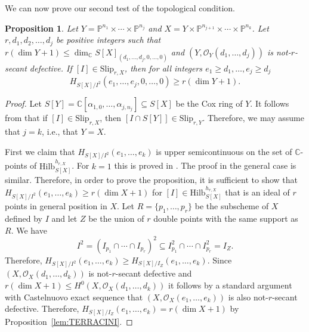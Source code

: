 \documentclass[12pt]{amsart}
\newtheorem{proposition}[theorem]{Proposition}
\theoremstyle{definition}
\theoremstyle{remark}
\theoremstyle{definition}
\newcommand{\HF}[2]{H_{#1}(#2)}
\newcommand{\Slip}[2]{\mathrm{Slip}_{#1,#2}}
\newcommand{\CC}{\mathbb{C}}
\newcommand{\OO}{\mathcal{O}}
\newcommand{\Hilb}{\mathrm{Hilb}}
\begin{document}
We can now prove our second test of the topological condition.


\begin{proposition}\label{prop:st_general}
Let $Y=\mathbb{P}^{n_1}\times \cdots \times \mathbb{P}^{n_j}$ and $X = Y \times \mathbb{P}^{n_{j+1}}\times \cdots \times \mathbb{P}^{n_k}$. Let $r, d_1, d_2,\ldots, d_j$ be positive integers such that 
$r(\dim Y+1) \leq \dim_\CC S[X]_{(d_1,\ldots, d_j, 0, \ldots, 0)}$ and $(Y,\OO_Y(d_1,\ldots, d_j))$ is not-$r$-secant defective. If $[I]\in \Slip{r}{X}$, then for all integers $e_1\geq d_1, \ldots, e_j\geq d_j$
\begin{equation}\label{ineq:st}
\HF{S[X]/I^2}{e_1,\ldots, e_j,0,\ldots, 0} \geq r(\dim Y+1).    
\end{equation}

\end{proposition} 
\begin{proof}
Let $S[Y]=\CC[\alpha_{1,0},\ldots, \alpha_{j,n_j}] \subseteq S[X]$ be the Cox ring of $Y$. It follows from \cite[Theorem~1.2]{Man23} that if $[I]\in \Slip{r}{X}$, then $[I\cap S[Y]]\in \Slip{r}{Y}$. Therefore, we may assume that $j=k$, i.e., that $Y=X$.

First we claim that $\HF{S[X]/I^2}{e_1,\ldots, e_k}$ is upper semicontinuous on the set of $\CC$-points of $\Hilb_{S[X]}^{h_{r,X}}$. For $k=1$ this is proved in \cite[Proof of Theorem~1.1]{Man22}.
The proof in the general case is similar. Therefore, in order to prove the proposition, it is sufficient to show that $\HF{S[X]/I^2}{e_1,\ldots, e_k} \geq r(\dim X+1)$ for $[I]\in \Hilb_{S[X]}^{h_{r,X}}$ that is an ideal of $r$ points in general position in $X$. Let $R = \{p_1,\ldots,p_r\}$ be the subscheme of $X$ defined by $I$ and let $Z$ be the union of $r$ double points with the same support as $R$.
We have 
\begin{equation}\label{eq:squarevssquare}
    I^2 = (I_{p_1}\cap \cdots \cap I_{p_r})^2\subseteq I_{p_1}^2\cap \cdots \cap I_{p_r}^2 = I_Z.
\end{equation}
Therefore, $\HF{S[X]/I^2}{e_1,\ldots, e_k}  \ge \HF{S[X]/I_Z}{e_1,\ldots, e_k}$. Since $(X,\OO_X(d_1,\ldots, d_k))$ is not-$r$-secant defective and $r(\dim X+1) \le H^0(X, \OO_X(d_1,\ldots,d_k))$
it follows by a standard argument with Castelnuovo exact sequence that $(X,\OO_X(e_1,\ldots, e_k))$ is also not-$r$-secant defective. Therefore, $\HF{S[X]/I_Z}{e_1,\ldots, e_k} = r(\dim X+1)$ by Proposition~\ref{lem:TERRACINI}. 
\end{proof}
\end{document}

